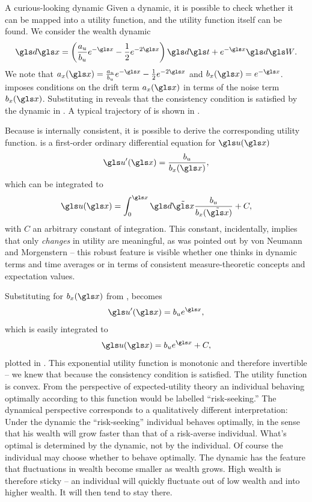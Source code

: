 \begin{example}{A curious-looking dynamic}
Given a dynamic, it is possible to check whether it can be mapped into
a utility function, and the utility function itself can be found. We consider the wealth dynamic
\begin{equation}
\gd\x=\left(\frac{a_u}{b_u}e^{-\x}-\frac{1}{2}e^{-2\x}\right)\gd\t+e^{-\x}\gd\gW.
\elabel{test_dyn}
\end{equation}
We note that $a_x(\x)=\frac{a_u}{b_u}e^{-\x}-\frac{1}{2}e^{-2\x}$ and $b_x(\x)=e^{-\x}$.
 imposes conditions on the drift term $a_x(\x)$ in terms of the 
noise term $b_x(\x)$. Substituting in  reveals that the consistency 
condition is satisfied by the dynamic in .
A typical trajectory of  is shown in .

Because  is internally consistent, it is possible to derive the corresponding utility function.
 is a first-order ordinary differential equation for $\gu(\x)$
\begin{align}
\gu'(\x)=\frac{b_u}{b_x(\x)},
\elabel{diff_eq_u}
\end{align}
which can be integrated to
\begin{align}
\gu(\x)=\int_0^\x \gd\tilde{\x} \frac{b_u}{b_x(\tilde{\x})}+C,
\end{align}
with $C$ an arbitrary constant of integration. This constant, incidentally, implies that 
only {\it changes} in utility are meaningful, as was pointed out by von 
Neumann and Morgenstern \cite{vonNeumannMorgenstern1944} -- this robust feature
is visible whether one thinks in dynamic terms and time averages or in terms of consistent
measure-theoretic concepts and expectation values.

Substituting for $b_x(\x)$ from ,  becomes
\begin{equation}
\gu'(\x)=b_u e^\x,
\end{equation}
which is easily integrated to
\begin{equation}
\gu(\x)=b_u e^\x +C,
\elabel{test_dyn_u}
\end{equation}
plotted in . This exponential utility function is monotonic and therefore invertible -- we knew that because the consistency condition is satisfied. 
The utility function is convex. From the 
perspective of expected-utility theory an individual behaving optimally according to 
this function would be labelled ``risk-seeking.'' 
The dynamical perspective corresponds to a qualitatively different interpretation: 
Under the dynamic  the ``risk-seeking'' individual behaves optimally, 
in the sense that his wealth will grow faster than that of a risk-averse individual. What's optimal is determined by the dynamic, not by the individual. Of course the individual may choose whether to behave optimally. 
The dynamic  has the feature that fluctuations in wealth become smaller
as wealth grows. High wealth is therefore sticky -- an individual will quickly fluctuate out of 
low wealth and into higher wealth. It will then tend to stay there. 
\end{example}

